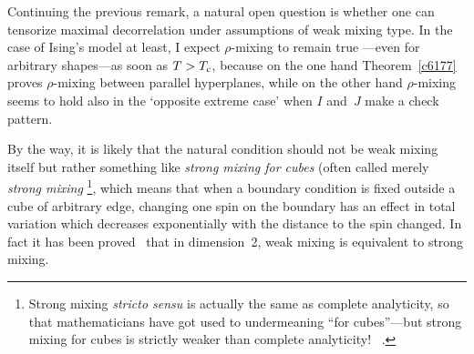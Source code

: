 \begin{Rmk}
Continuing the previous remark,
a natural open question is whether one can tensorize maximal decorrelation
under assumptions of weak mixing type.
%
In the case of Ising's model at least, I expect $\rho$-mixing to remain true%
—even for arbitrary shapes—as soon as $T>T_{\mathrm{c}}$,
because on the one hand Theorem~\ref{c6177}
proves $\rho$-mixing between parallel hyperplanes,
while on the other hand $\rho$-mixing
seems to hold also in the `opposite extreme case'
when $I$ and~$J$ make a check pattern.

By the way, it is likely that the natural condition
should not be weak mixing itself but rather something like \emph{strong mixing for cubes}
(often called merely \emph{strong mixing}%
\footnote{Strong mixing \emph{stricto sensu} is actually
the same as complete analyticity, so that mathematicians have got used to undermeaning
``for cubes''—but strong mixing for cubes is strictly weaker than complete analyticity!%
~\cite[\S~2]{MO}.},
which means that when a boundary condition is fixed outside a cube of arbitrary edge,
changing one spin on the boundary has an effect in total variation
which decreases exponentially with the distance to the spin changed.
%
In fact it has been proved~\cite{MOS} that in dimension~2,
weak mixing is equivalent to strong mixing.
\end{Rmk}


